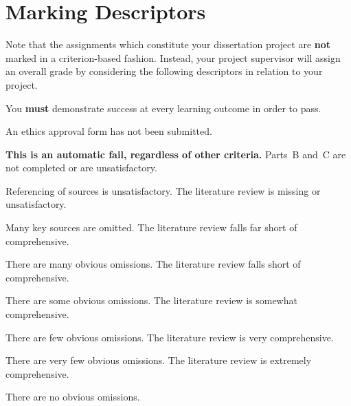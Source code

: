 \chapter{Marking Descriptors}

Note that the assignments which constitute your dissertation project are \textbf{not} marked in a criterion-based fashion.
Instead, your project supervisor will assign an overall grade by considering the following descriptors in relation to your project.

You \textbf{must} demonstrate success at every learning outcome in order to pass.

\begin{markingrubric}
		\grade\fail An ethics approval form has not been submitted.
			\par \textbf{This is an automatic fail, regardless of other criteria.}
		\grade\fail Parts~B and~C are not completed or are unsatisfactory.
			\par Referencing of sources is unsatisfactory.
        \grade \fail 	The literature review is missing or unsatisfactory.
        	\par 		Many key sources are omitted.
        \grade 		The literature review falls far short of comprehensive.
        	\par 		There are many obvious omissions.
        \grade		The literature review falls short of comprehensive.
        	\par 		There are some obvious omissions.
        \grade 		The literature review is somewhat comprehensive.
        	\par 		There are few obvious omissions.
        \grade		The literature review is very comprehensive.
        	\par 		There are very few obvious omissions.
        \grade		The literature review is extremely comprehensive.
        	\par 		There are no obvious omissions.

\end{markingrubric}
